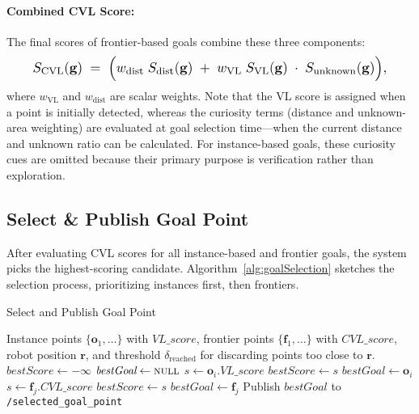 \paragraph{Combined CVL Score:}
The final scores of frontier-based goals combine these three components:
\begin{equation}\label{eq:CVL}
\resizebox{0.91\linewidth}{!}{$
S_{\mathrm{CVL}}(\mathbf{g})
\;=\;
\Bigl(
   w_{\mathrm{dist}}\;
   S_{\mathrm{dist}}(\mathbf{g})
   \;
   +\;
   w_{\mathrm{VL}}\;
   S_{\mathrm{VL}}(\mathbf{g})
   \;\cdot\;
   S_{\mathrm{unknown}}(\mathbf{g})
\Bigr),
$}
\end{equation}
where \(w_{\mathrm{VL}}\) and \(w_{\mathrm{dist}}\) are scalar weights. Note that the VL score is assigned when a point is initially detected, whereas the curiosity terms (distance and unknown-area weighting) are evaluated at goal selection time—when the current distance and unknown ratio can be calculated. For instance-based goals, these curiosity cues are omitted because their primary purpose is verification rather than exploration.



\subsection{Select \& Publish Goal Point}

After evaluating CVL scores for all instance-based and frontier goals, the system picks the highest-scoring candidate. Algorithm~\ref{alg:goalSelection} sketches the selection process, prioritizing instances first, then frontiers.

\begin{algorithm}[ht]
\caption{Select and Publish Goal Point}
\label{alg:goalSelection}
\begin{algorithmic}[1]
\REQUIRE Instance points \(\{\mathbf{o}_1,\dots\}\) with \(VL\_score\), frontier points \(\{\mathbf{f}_1,\dots\}\) with \(CVL\_score\), robot position \(\mathbf{r}\), and threshold \(\delta_{\mathrm{reached}}\) for discarding points too close to \(\mathbf{r}\).
\STATE \(\textit{bestScore} \leftarrow -\infty\)
\STATE \(\textit{bestGoal} \leftarrow \textsc{null}\)
        \STATE \(s \leftarrow \mathbf{o}_i.\textit{VL\_score}\)
            \STATE \(\textit{bestScore} \leftarrow s\)
            \STATE \(\textit{bestGoal} \leftarrow \mathbf{o}_i\)
        \ENDIF
    \ENDIF
\ENDFOR
{}
            \STATE \(s \leftarrow \mathbf{f}_j.\textit{CVL\_score}\)
                \STATE \(\textit{bestScore} \leftarrow s\)
                \STATE \(\textit{bestGoal} \leftarrow \mathbf{f}_j\)
            \ENDIF
        \ENDIF
    \ENDFOR
\ENDIF
{}
    \STATE Publish \(\textit{bestGoal}\) to \texttt{/selected\_goal\_point}
\ENDIF
\RETURN
\end{algorithmic}
\end{algorithm}

